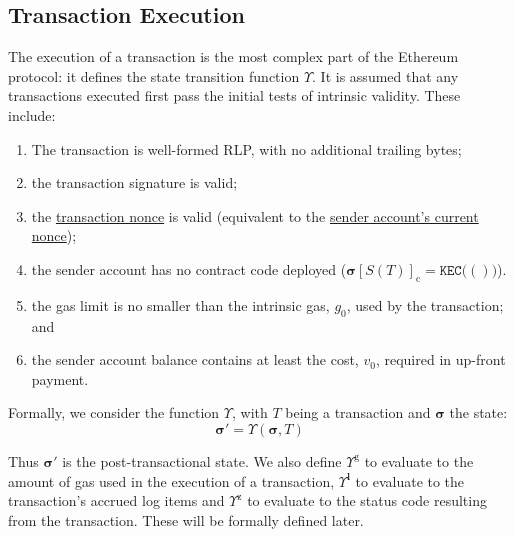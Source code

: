\documentclass[9pt,oneside]{amsart}
\begin{document}
\begin{multicols}{2}

\section{Transaction Execution} \label{ch:transactions}

The execution of a transaction is the most complex part of the Ethereum protocol: it defines the state transition function \hyperlink{Upsilon_state_transition}{$\Upsilon$}. It is assumed that any transactions executed first pass the initial tests of intrinsic validity. These include:

\begin{enumerate}
\item The transaction is well-formed RLP, with no additional trailing bytes;
\item the transaction signature is valid;
\item the \hyperlink{transaction_nonce}{transaction nonce} is valid (equivalent to the \hyperlink{account_nonce}{sender account's current nonce});
\item the sender account has no contract code deployed ($\boldsymbol{\sigma}[S(T)]_{\mathrm{c}} = \texttt{KEC}\big( () \big)$).
\item the gas limit is no smaller than the intrinsic gas, $g_0$, used by the transaction; and
\item the sender account balance contains at least the cost, $v_0$, required in up-front payment.
\end{enumerate}

Formally, we consider the function \hyperlink{Upsilon_state_transition}{$\Upsilon$}, with $T$ being a transaction and $\boldsymbol{\sigma}$ the state:
\begin{equation}
\boldsymbol{\sigma}' = \Upsilon(\boldsymbol{\sigma}, T)
\end{equation}

Thus $\boldsymbol{\sigma}'$ is the post-transactional state. We also define \hyperlink{tx_total_gas_used_Upsilon_pow_g}{$\Upsilon^{\mathrm{g}}$} to evaluate to the amount of gas used in the execution of a transaction, \hyperlink{tx_logs_Upsilon_pow_l}{$\Upsilon^{\mathbf{l}}$} to evaluate to the transaction's accrued log items and \hyperlink{tx_status_Upsilon_pow_z}{$\Upsilon^{\mathrm{z}}$} to evaluate to the status code resulting from the transaction. These will be formally defined later.


\end{multicols}
\end{document}
